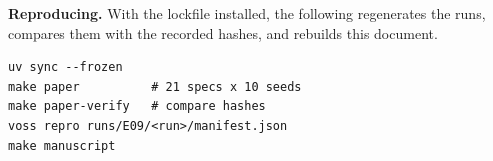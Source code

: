 \par\smallskip\noindent\textbf{Reproducing.} With the lockfile installed, the following regenerates the runs, compares them with the recorded hashes, and rebuilds this document.
{\footnotesize
\begin{verbatim}
uv sync --frozen
make paper          # 21 specs x 10 seeds
make paper-verify   # compare hashes
voss repro runs/E09/<run>/manifest.json
make manuscript
\end{verbatim}}
